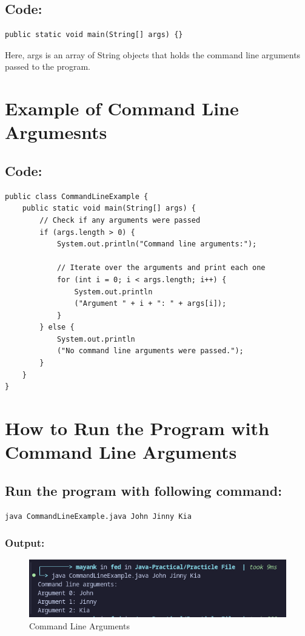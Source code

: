 \documentclass[a4paper,12pt]{article}
\begin{document}
\subsection{Code: }
\begin{lstlisting}
public static void main(String[] args) {}
\end{lstlisting}
Here, args is an array of String objects that holds the command line arguments passed to the program.

\section{Example of Command Line Argumesnts}
\subsection{Code: }
\begin{lstlisting}
public class CommandLineExample {
    public static void main(String[] args) {
        // Check if any arguments were passed
        if (args.length > 0) {
            System.out.println("Command line arguments:");

            // Iterate over the arguments and print each one
            for (int i = 0; i < args.length; i++) {
                System.out.println
                ("Argument " + i + ": " + args[i]);
            }
        } else {
            System.out.println
            ("No command line arguments were passed.");
        }
    }
}    
\end{lstlisting}
\section{How to Run the Program with Command Line Arguments}
\subsection{Run the program with following command: }
\begin{lstlisting}
java CommandLineExample.java John Jinny Kia
\end{lstlisting}
\subsubsection{Output: }
\begin{figure}[H]
    \centering
    \includegraphics[width=0.9\linewidth]{images/CLA.png}
    \caption{Command Line Arguments}
    \label{fig:sample_image}
\end{figure}
\end{document}
